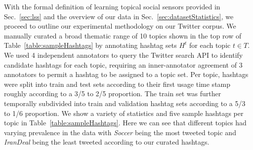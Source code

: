 With the formal definition of learning topical social sensors provided
in Sec.~\ref{sec:lss} and the overview of our data in
Sec.~\ref{sec:datasetStatistics}, we proceed to outline our
experimental methodology on our Twitter corpus.  We manually curated a
broad thematic range of 10 topics shown in the top row of
Table~\ref{table:sampleHashtags}
by annotating hashtag sets $H^t$ for each topic $t \in T$.  We used 4
independent annotators to query the Twitter search API to identify
candidate hashtags for each topic, requiring an inner-annotator
agreement of 3 annotators to permit a hashtag to be assigned to a
topic set.  Per topic, hashtags were split into train and test sets
according to their first usage time stamp roughly according to a 3/5
to 2/5 proportion.  The train set was further temporally subdivided
into train and validation hashtag sets according to a 5/3 to 1/6
proportion.  We show a variety of statistics and five sample hashtags
per topic in Table~\ref{table:sampleHashtags}.  Here we can see that
different topics had varying prevalence in the data
with \textit{Soccer} being the most tweeted topic
and \textit{IranDeal} being the least tweeted according to our curated
hashtags.

